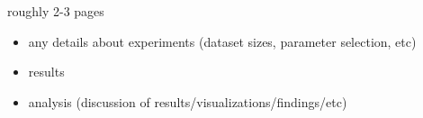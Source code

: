 roughly 2-3 pages
\begin{itemize}
\item any details about experiments (dataset sizes, parameter selection, etc)
\item results
\item analysis (discussion of results/visualizations/findings/etc)
\end{itemize}
